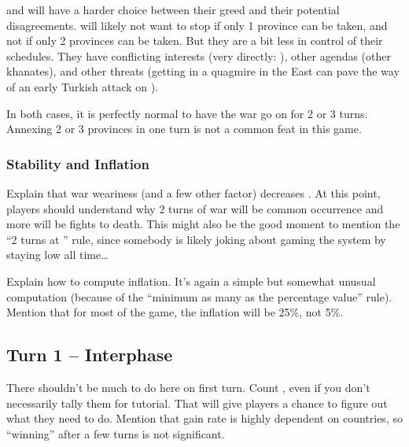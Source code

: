 \aparag \POL and \RUS will have a harder choice between their greed and their
potential disagreements. \POL will likely not want to stop if only 1 province
can be taken, and \RUS not if only 2 provinces can be taken.
\bparag But they are a bit less in control of their schedules. They have
conflicting interests (very directly: \provinceSmolenska), other agendas
(other khanates), and other threats (\POL getting in a quagmire in the East
can pave the way of an early Turkish attack on \paysHongrie).

\aparag In both cases, it is perfectly normal to have the war go on for 2 or 3
turns. Annexing 2 or 3 provinces in one turn is not a common feat in this
game.

\subsubsection{Stability and Inflation}
\aparag Explain that war weariness (and a few other factor) decreases \STAB.
\bparag At this point, players should understand why 2 turns of war will be
common occurrence and more will be fights to death.
\bparag This might also be the good moment to mention the ``2 turns at
'' rule, since somebody is likely joking about gaming the system by
staying low all time\ldots

\aparag Explain how to compute inflation. It's again a simple but somewhat
unusual computation (because of the ``minimum as many \ducats as the
percentage value'' rule).
\bparag Mention that for most of the game, the inflation will be 25\%, not
5\%.

\subsection{Turn 1 -- Interphase}
\aparag There shouldn't be much to do here on first turn.
\bparag Count \VPs, even if you don't necessarily tally them for
tutorial. That will give players a chance to figure out what they need to do.
\bparag Mention that \VPs gain rate is highly dependent on countries, so
``winning'' after a few turns is not significant.


